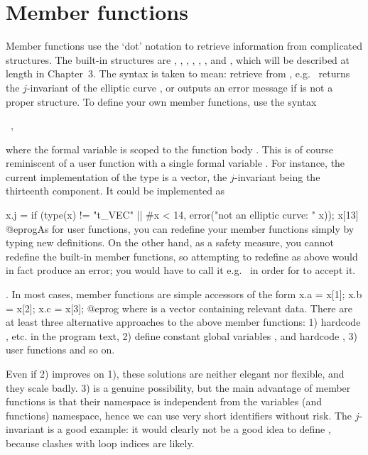 \section{Member functions} \label{se:member}

Member functions use the `dot' notation to retrieve information from
complicated structures. The built-in structures are , ,
, , , ,  and , which
will be described at length in Chapter~3. The syntax 
is taken to mean: retrieve  from ,
e.g.~ returns the $j$-invariant of the elliptic curve ,
or outputs an error message if  is not a proper  structure.
To define your own member functions, use the syntax

\ ,

\noindent where the formal variable  is scoped to the function
body . This is of course reminiscent of a user function with a
single formal variable . For instance, the current implementation of
the  type is a vector, the $j$-invariant being the thirteenth
component. It could be implemented as

\bprog
x.j =
{
  if (type(x) != "t_VEC" || #x < 14, error("not an elliptic curve: " x));
  x[13]
}
@eprog\noindent As for user functions, you can redefine your member functions
simply by typing new definitions. On the other hand, as a safety measure, you
cannot redefine the built-in member functions, so attempting to redefine
 as above would in fact produce an error; you would have to call it
e.g.~ in order for  to accept it.

. In most cases, member functions are simple accessors
of the form
\bprog
  x.a = x[1];
  x.b = x[2];
  x.c = x[3];
@eprog\noindent
where  is a vector containing relevant data. There are at least
three alternative approaches to the above member functions: 1) hardcode
, etc. in the program text, 2) define constant global variables
,   and hardcode , 3)
user functions  and so on.

Even if 2) improves on 1), these solutions are neither elegant nor flexible,
and they scale badly. 3) is a genuine possibility, but the main advantage of
member functions is that their namespace is independent from the variables
(and functions) namespace, hence we can use very short identifiers without
risk. The $j$-invariant is a good example: it would clearly not be a good
idea to define , because clashes with loop indices are
likely.

